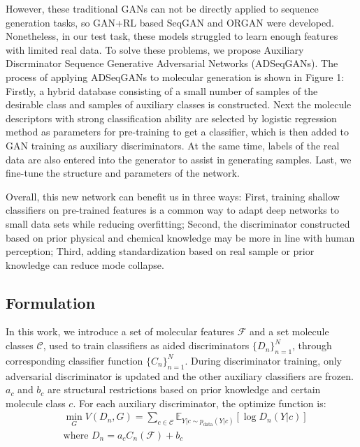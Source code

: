 \documentclass[10pt, twocolumn]{article}
\begin{document}
However, these traditional GANs can not be directly applied to sequence generation tasks, so GAN+RL based SeqGAN and ORGAN were developed. Nonetheless, in our test task, these models struggled to learn enough features with limited real data. To solve these problems, we propose Auxiliary Discrminator Sequence Generative Adversarial Networks (ADSeqGANs). The process of applying ADSeqGANs to molecular generation is shown in Figure 1: Firstly, a hybrid database consisting of a small number of samples of the desirable class and samples of auxiliary classes is constructed. Next the molecule descriptors with strong classification ability are selected by logistic regression method as parameters for pre-training to get a classifier, which is then added to GAN training as auxiliary discriminators. At the same time, labels of the real data are also entered into the generator to assist in generating samples. Last, we fine-tune the structure and parameters of the network.


Overall, this new network can benefit us in three ways: First, training shallow classifiers on pre-trained features is a common way to adapt deep networks to small data sets while reducing overfitting\cite{Girshick2014,Chen2019,Liang2025}; Second, the discriminator constructed based on prior physical and chemical knowledge may be more in line with human perception\cite{Zhang2018}; Third, adding standardization based on real sample or prior knowledge can reduce mode collapse\cite{Dai2023}.
\subsection{Formulation}
In this work, we introduce a set of molecular features $\mathcal{F}$ and a set molecule classes $\mathcal{C}$, used to train classifiers as aided discriminators ${\{D_n\}}^N_{n=1}$, through corresponding classifier function ${\{C_n\}}^N_{n=1}$. During discriminator training, only adversarial discriminator is updated and the other auxiliary classifiers are frozen. $a_c$ and $b_c$ are structural restrictions based on prior knowledge and certain molecule class $c$. For each auxiliary discriminator, the optimize function is:
\begin{equation}
\begin{aligned}
&\min_{G}V(D_n,G) = \sum_{c \in \mathcal{C}}\mathbb{E}_{Y|c \sim p_{\text{data}}(Y|c)}[\log D_n(Y|c)] \\
&\text{where }D_n = a_cC_n(\mathcal{F})+b_c
\end{aligned}
\tag{2}
\end{equation}
\end{document}
